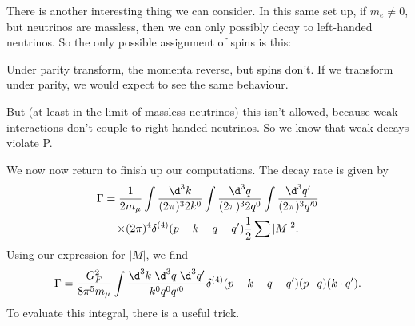 \documentclass[a4paper]{article}
\begin{document}
There is another interesting thing we can consider. In this same set up, if $m_e \not= 0$, but neutrinos are massless, then we can only possibly decay to left-handed neutrinos. So the only possible assignment of spins is this:
\begin{center}
\end{center}
Under parity transform, the momenta reverse, but spins don't. If we transform under parity, we would expect to see the same behaviour.
\begin{center}
\end{center}
But (at least in the limit of massless neutrinos) this isn't allowed, because weak interactions don't couple to right-handed neutrinos. So we know that weak decays violate P.

We now now return to finish up our computations. The decay rate is given by
\begin{multline*}
  \Gamma = \frac{1}{2 m_\mu} \int \frac{\d^3 k}{(2\pi)^3 2k^0} \int \frac{\d^3 q}{(2\pi)^3 2q^0} \int \frac{\d^3 q'}{(2\pi)^3 q'^0} \\
  \times (2\pi)^4 \delta^{(4)}(p - k - q - q') \frac{1}{2} \sum |M|^2.
\end{multline*}
Using our expression for $|M|$, we find
\[
  \Gamma = \frac{G_F^2}{8 \pi^5 m_\mu} \int \frac{\d^3 k\; \d^3 q\; \d^3 q'}{k^0 q^0 q'^0} \delta^{(4)} (p - k - q - q') (p \cdot q) (k \cdot q').
\]
To evaluate this integral, there is a useful trick.
\end{document}
